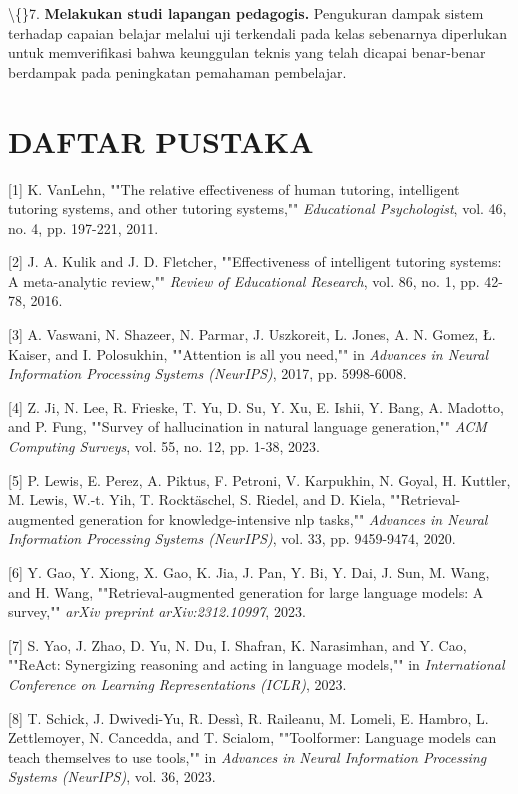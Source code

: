 \documentclass[12pt,a4paper]{article}
\begin{document}
\textbackslash\{\}7. \textbf{Melakukan studi lapangan pedagogis.} Pengukuran dampak sistem terhadap capaian belajar melalui uji terkendali pada kelas sebenarnya diperlukan untuk memverifikasi bahwa keunggulan teknis yang telah dicapai benar-benar berdampak pada peningkatan pemahaman pembelajar.

\section*{DAFTAR PUSTAKA}
{[}1{]}	K. VanLehn, ""The relative effectiveness of human tutoring, intelligent tutoring systems, and other tutoring systems,"" \textit{Educational Psychologist}, vol. 46, no. 4, pp. 197-221, 2011.

{[}2{]}	J. A. Kulik and J. D. Fletcher, ""Effectiveness of intelligent tutoring systems: A meta-analytic review,"" \textit{Review of Educational Research}, vol. 86, no. 1, pp. 42-78, 2016.

{[}3{]}	A. Vaswani, N. Shazeer, N. Parmar, J. Uszkoreit, L. Jones, A. N. Gomez, Ł. Kaiser, and I. Polosukhin, ""Attention is all you need,"" in \textit{Advances in Neural Information Processing Systems (NeurIPS)}, 2017, pp. 5998-6008.

{[}4{]}	Z. Ji, N. Lee, R. Frieske, T. Yu, D. Su, Y. Xu, E. Ishii, Y. Bang, A. Madotto, and P. Fung, ""Survey of hallucination in natural language generation,"" \textit{ACM Computing Surveys}, vol. 55, no. 12, pp. 1-38, 2023.

{[}5{]}	P. Lewis, E. Perez, A. Piktus, F. Petroni, V. Karpukhin, N. Goyal, H. Kuttler, M. Lewis, W.-t. Yih, T. Rocktäschel, S. Riedel, and D. Kiela, ""Retrieval-augmented generation for knowledge-intensive nlp tasks,"" \textit{Advances in Neural Information Processing Systems (NeurIPS)}, vol. 33, pp. 9459-9474, 2020.

{[}6{]}	Y. Gao, Y. Xiong, X. Gao, K. Jia, J. Pan, Y. Bi, Y. Dai, J. Sun, M. Wang, and H. Wang, ""Retrieval-augmented generation for large language models: A survey,"" \textit{arXiv preprint arXiv:2312.10997}, 2023.

{[}7{]}	S. Yao, J. Zhao, D. Yu, N. Du, I. Shafran, K. Narasimhan, and Y. Cao, ""ReAct: Synergizing reasoning and acting in language models,"" in \textit{International Conference on Learning Representations (ICLR)}, 2023.

{[}8{]}	T. Schick, J. Dwivedi-Yu, R. Dessì, R. Raileanu, M. Lomeli, E. Hambro, L. Zettlemoyer, N. Cancedda, and T. Scialom, ""Toolformer: Language models can teach themselves to use tools,"" in \textit{Advances in Neural Information Processing Systems (NeurIPS)}, vol. 36, 2023.
\end{document}
